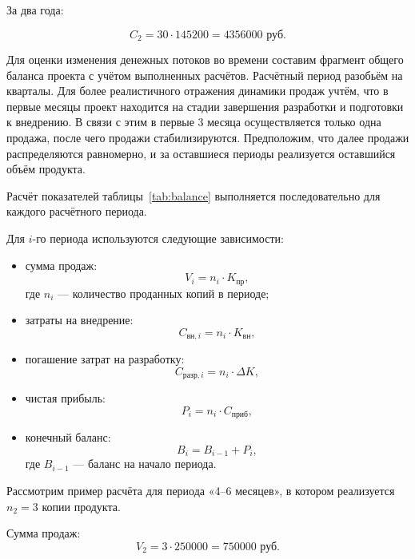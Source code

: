 За два года:

\[
C_2 = 30 \cdot 145200 = 4356000 \text{ руб.}
\]

Для оценки изменения денежных потоков во времени составим фрагмент общего
баланса проекта с учётом выполненных расчётов. Расчётный период разобьём на
кварталы. Для более реалистичного отражения динамики продаж учтём, что в первые
месяцы проект находится на стадии завершения разработки и подготовки к
внедрению. В связи с этим в первые 3 месяца осуществляется только одна продажа,
после чего продажи стабилизируются. Предположим, что далее продажи
распределяются равномерно, и за оставшиеся периоды реализуется оставшийся объём
продукта.

Расчёт показателей таблицы~\ref{tab:balance} выполняется последовательно
для каждого расчётного периода.

Для $i$-го периода используются следующие зависимости:

\begin{itemize}
\item сумма продаж:
\begin{equation}
V_i = n_i \cdot K_{\text{пр}},
\end{equation}
где $n_i$ --- количество проданных копий в периоде;

\item затраты на внедрение:
\begin{equation}
C_{\text{вн},i} = n_i \cdot K_{\text{вн}},
\end{equation}

\item погашение затрат на разработку:
\begin{equation}
C_{\text{разр},i} = n_i \cdot \Delta K,
\end{equation}

\item чистая прибыль:
\begin{equation}
P_i = n_i \cdot C_{\text{приб}},
\end{equation}

\item конечный баланс:
\begin{equation}
B_i = B_{i-1} + P_i,
\end{equation}
где $B_{i-1}$ --- баланс на начало периода.
\end{itemize}

Рассмотрим пример расчёта для периода «4--6 месяцев», в котором
реализуется $n_2 = 3$ копии продукта.

Сумма продаж:
\[
V_2 = 3 \cdot 250000 = 750000 \text{ руб.}
\]

